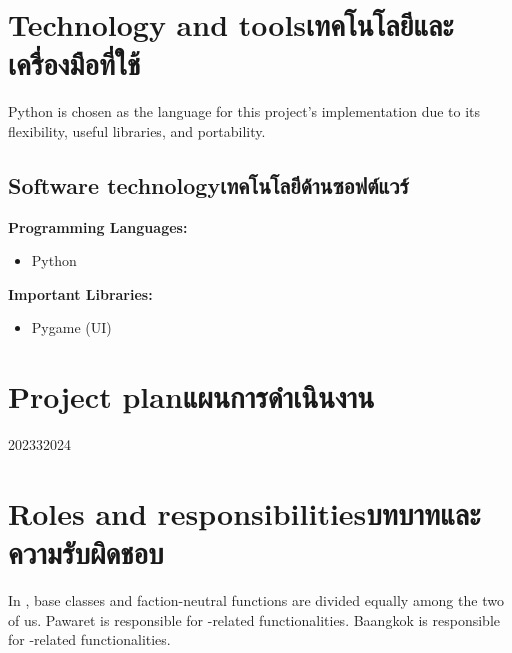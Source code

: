 \section{\ifenglish Technology and tools\else เทคโนโลยีและเครื่องมือที่ใช้\fi}
Python is chosen as the language for this project's implementation due to its flexibility, useful libraries, and portability.


\subsection{\ifenglish Software technology\else เทคโนโลยีด้านซอฟต์แวร์\fi}
\textbf{Programming Languages:}
\begin{itemize}
    \item Python
\end{itemize}
\textbf{Important Libraries:}
\begin{itemize}
    \item Pygame (UI) 
\end{itemize}

\section{\ifenglish Project plan\else แผนการดำเนินงาน\fi}

\begin{plan}{6}{2023}{3}{2024}
\end{plan}

\section{\ifenglish Roles and responsibilities\else บทบาทและความรับผิดชอบ\fi}
In \RootOurs{}, base classes and faction-neutral functions are divided equally among the two of us. Pawaret is responsible for \Marquise{}-related functionalities. Baangkok is responsible for \Eyrie{}-related functionalities.

